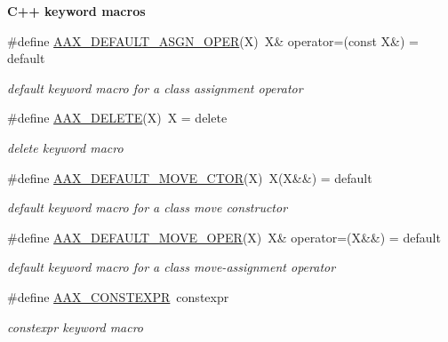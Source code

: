 \begin{Indent}{\bf C++ keyword macros}
\begin{DoxyCompactItemize}
\#define \hyperlink{a00149_aded8c9ff9a00f3780ae99be88573a5ce}{A\+A\+X\+\_\+\+D\+E\+F\+A\+U\+L\+T\+\_\+\+A\+S\+G\+N\+\_\+\+O\+P\+E\+R}(X)~X\& operator=(const X\&) = default
\begin{DoxyCompactList}\small\item\em {\ttfamily default} keyword macro for a class assignment operator \end{DoxyCompactList}\item 
\#define \hyperlink{a00149_a2511e9b022e49caf594bca6fa6bff74c}{A\+A\+X\+\_\+\+D\+E\+L\+E\+T\+E}(X)~X = delete
\begin{DoxyCompactList}\small\item\em {\ttfamily delete} keyword macro \end{DoxyCompactList}\item 
\#define \hyperlink{a00149_a25bcd6f9d38bd2c9ffbf8aff01b4a274}{A\+A\+X\+\_\+\+D\+E\+F\+A\+U\+L\+T\+\_\+\+M\+O\+V\+E\+\_\+\+C\+T\+O\+R}(X)~X(X\&\&) = default
\begin{DoxyCompactList}\small\item\em {\ttfamily default} keyword macro for a class move constructor \end{DoxyCompactList}\item 
\#define \hyperlink{a00149_a0478af896a79eddf2ddee1cfd403e6b0}{A\+A\+X\+\_\+\+D\+E\+F\+A\+U\+L\+T\+\_\+\+M\+O\+V\+E\+\_\+\+O\+P\+E\+R}(X)~X\& operator=(X\&\&) = default
\begin{DoxyCompactList}\small\item\em {\ttfamily default} keyword macro for a class move-\/assignment operator \end{DoxyCompactList}\item 
\#define \hyperlink{a00149_aa7cfdcabcfd72ca9b829e6cea9ea6470}{A\+A\+X\+\_\+\+C\+O\+N\+S\+T\+E\+X\+P\+R}~constexpr
\begin{DoxyCompactList}\small\item\em {\ttfamily constexpr} keyword macro \end{DoxyCompactList}\end{DoxyCompactItemize}
\end{Indent}
